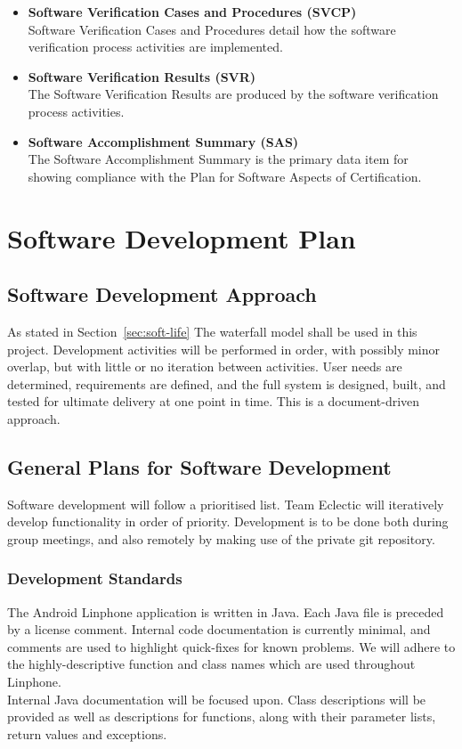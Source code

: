 \documentclass[11pt]{article}
\begin{document}
\begin{itemize}
\item \textbf{Software Verification Cases and Procedures (SVCP)} \\
Software Verification Cases and Procedures detail how the software verification process activities are implemented.
\item \textbf{Software Verification Results (SVR)} \\
The Software Verification Results are produced by the software verification process activities.
\item \textbf{Software Accomplishment Summary (SAS)} \\
The Software Accomplishment Summary is the primary data item for showing compliance with the Plan for Software Aspects of Certification.
\end{itemize}

\section{Software Development Plan}
\subsection{Software Development Approach}
As stated in Section~\ref{sec:soft-life} The waterfall model shall be used in this project.
Development activities will be performed in order, with possibly minor overlap, but with little or no iteration between activities. User needs are determined, requirements are defined, and the full system is designed, built, and tested for ultimate delivery at one point in time. This is a document-driven approach.

\subsection{General Plans for Software Development}
Software development will follow a prioritised list. Team Eclectic will iteratively develop functionality in order of priority. Development is to be done both during group meetings, and also remotely by making use of the private git repository.
\subsubsection{Development Standards}
The Android Linphone application is written in Java. Each Java file is preceded by a license comment. Internal code documentation is currently minimal, and comments are used to highlight quick-fixes for known problems. We will adhere to the highly-descriptive function and class names which are used throughout Linphone. \\
Internal Java documentation will be focused upon. Class descriptions will be provided as well as descriptions for functions, along with their parameter lists, return values and exceptions.
\end{document}
